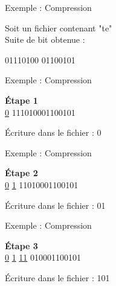 \documentclass[french]{beamer}
\begin{document}
\begin{frame}{Exemple : Compression}
	\begin{center}
	Soit un fichier contenant "te"\\
	Suite de bit obtenue : 
	\end{center}	
	\begin{center}	
	01110100 01100101
	\end{center}
\end{frame}

\begin{frame}{Exemple : Compression}
	\begin{center}
	\textbf{Étape 1} \\
	\underline{0} 111010001100101 \\
	\end{center}
	\begin{flushleft}
	Écriture dans le fichier : 0
	\end{flushleft}
\end{frame}

\begin{frame}{Exemple : Compression}
	\begin{center}
	\textbf{Étape 2} \\
	\underline{0} \underline{1} 11010001100101 \\
	\end{center}
	\begin{flushleft}
	Écriture dans le fichier : 01
	\end{flushleft}
\end{frame}

\begin{frame}{Exemple : Compression}
	\begin{center}
	\textbf{Étape 3} \\
	\underline{0} \underline{1} \underline{11} 010001100101 \\
	\end{center}
	\begin{flushleft}
	Écriture dans le fichier : 101
	\end{flushleft}
\end{frame}
\end{document}
